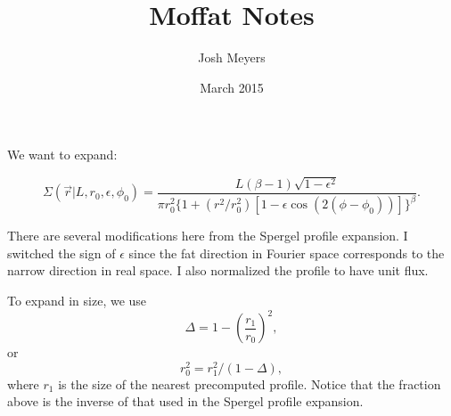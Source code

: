 \documentclass{article}
\title{Moffat Notes}
\author{Josh Meyers}
\date{March 2015}
\begin{document}
We want to expand:

\begin{equation}
  \label{eqn:SBdef}
  \Sigma(\vec{r}|L,r_0,\epsilon,\phi_0) = \frac{L (\beta-1)\sqrt{1-\epsilon^2}}{\pi r_0^2 \{1+(r^2/r_0^2)[1-\epsilon\cos(2(\phi-\phi_0))]\}^\beta}.
\end{equation}

There are several modifications here from the Spergel profile expansion.
I switched the sign of $\epsilon$ since the fat direction in Fourier space corresponds to the narrow direction in real space.
I also normalized the profile to have unit flux.

To expand in size, we use
\begin{equation}
  \Delta = 1 - \left(\frac{r_1}{r_0}\right)^2,
\end{equation}
or
\begin{equation}
  r_0^2 = r_1^2/(1-\Delta),
\end{equation}
where $r_1$ is the size of the nearest precomputed profile.
Notice that the fraction above is the inverse of that used in the Spergel profile expansion.
\end{document}
